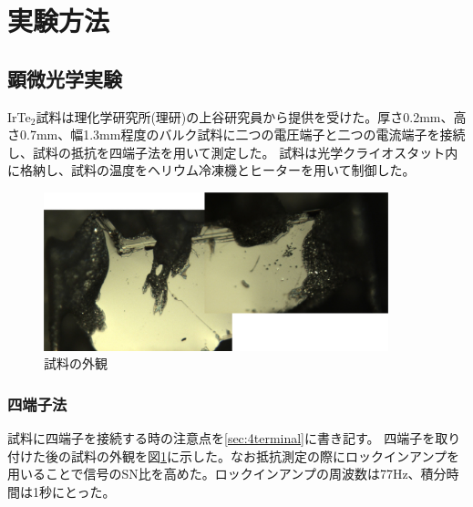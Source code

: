 \documentclass[11pt,a4paper]{jsarticle}
\begin{document}

\section{実験方法}
\subsection{顕微光学実験}
IrTe$_2$試料は理化学研究所(理研)の上谷研究員から提供を受けた。厚さ0.2mm、高さ0.7mm、幅1.3mm程度のバルク試料に二つの電圧端子と二つの電流端子を接続し、試料の抵抗を四端子法を用いて測定した。
試料は光学クライオスタット内に格納し、試料の温度をヘリウム冷凍機とヒーターを用いて制御した。
\begin{figure}[htb]
  \begin{center}
   \includegraphics[width=100mm]{sample.eps}
  \end{center}
  \caption{試料の外観}
  \label{fig:sample}
\end{figure}

\subsubsection{四端子法}
試料に四端子を接続する時の注意点を\ref{sec:4terminal}に書き記す。 四端子を取り付けた後の試料の外観を図\ref{fig:sample}に示した。なお抵抗測定の際にロックインアンプを用いることで信号のSN比を高めた。ロックインアンプの周波数は77Hz、積分時間は1秒にとった。
\end{document}
